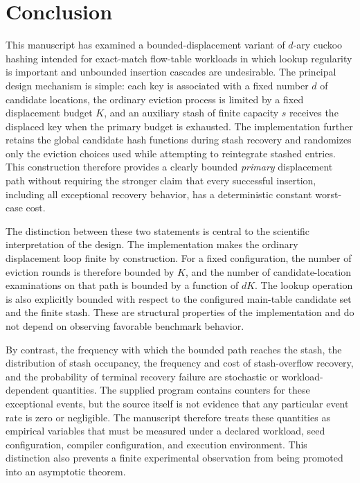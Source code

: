 \documentclass[conference]{IEEEtran}
\begin{document}

\section{Conclusion}
\label{sec:conclusion}

This manuscript has examined a bounded-displacement variant of $d$-ary cuckoo hashing intended for exact-match flow-table workloads in which lookup regularity is important and unbounded insertion cascades are undesirable. The principal design mechanism is simple: each key is associated with a fixed number $d$ of candidate locations, the ordinary eviction process is limited by a fixed displacement budget $K$, and an auxiliary stash of finite capacity $s$ receives the displaced key when the primary budget is exhausted. The implementation further retains the global candidate hash functions during stash recovery and randomizes only the eviction choices used while attempting to reintegrate stashed entries. This construction therefore provides a clearly bounded \emph{primary} displacement path without requiring the stronger claim that every successful insertion, including all exceptional recovery behavior, has a deterministic constant worst-case cost.

The distinction between these two statements is central to the scientific interpretation of the design. The implementation makes the ordinary displacement loop finite by construction. For a fixed configuration, the number of eviction rounds is therefore bounded by $K$, and the number of candidate-location examinations on that path is bounded by a function of $dK$. The lookup operation is also explicitly bounded with respect to the configured main-table candidate set and the finite stash. These are structural properties of the implementation and do not depend on observing favorable benchmark behavior.

By contrast, the frequency with which the bounded path reaches the stash, the distribution of stash occupancy, the frequency and cost of stash-overflow recovery, and the probability of terminal recovery failure are stochastic or workload-dependent quantities. The supplied program contains counters for these exceptional events, but the source itself is not evidence that any particular event rate is zero or negligible. The manuscript therefore treats these quantities as empirical variables that must be measured under a declared workload, seed configuration, compiler configuration, and execution environment. This distinction also prevents a finite experimental observation from being promoted into an asymptotic theorem.
\end{document}
